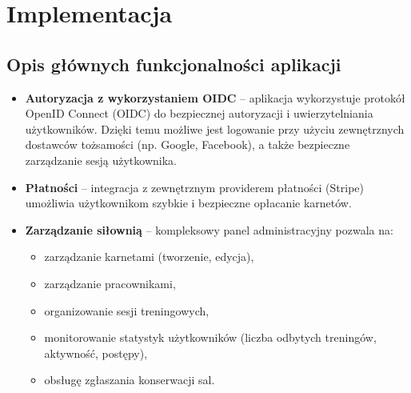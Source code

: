 \documentclass[../../spr.tex]{subfiles}
\begin{document}
\newpage
\section{Implementacja}

\subsection{Opis głównych funkcjonalności aplikacji}

\begin{itemize}
  \item \textbf{Autoryzacja z wykorzystaniem OIDC} – aplikacja wykorzystuje protokół OpenID Connect (OIDC) do bezpiecznej autoryzacji i uwierzytelniania użytkowników. Dzięki temu możliwe jest logowanie przy użyciu zewnętrznych dostawców tożsamości (np. Google, Facebook), a także bezpieczne zarządzanie sesją użytkownika.

  \item \textbf{Płatności} – integracja z zewnętrznym providerem płatności  (Stripe) umożliwia użytkownikom szybkie i bezpieczne opłacanie karnetów.

  \item \textbf{Zarządzanie siłownią} – kompleksowy panel administracyjny pozwala na:
        \begin{itemize}
          \item zarządzanie karnetami (tworzenie, edycja),
          \item zarządzanie pracownikami,
          \item organizowanie sesji treningowych,
          \item monitorowanie statystyk użytkowników (liczba odbytych treningów, aktywność, postępy),
          \item obsługę zgłaszania konserwacji sal.
        \end{itemize}
\end{itemize}

\newpage
\end{document}
